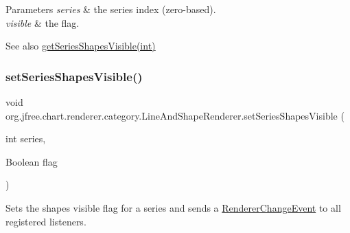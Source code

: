 \begin{DoxyParams}{Parameters}
{\em series} & the series index (zero-\/based). \\
\hline
{\em visible} & the flag.\\
\hline
\end{DoxyParams}
\begin{DoxySeeAlso}{See also}
\mbox{\hyperlink{classorg_1_1jfree_1_1chart_1_1renderer_1_1category_1_1_line_and_shape_renderer_af607c5d82294d4f53fb28935994c715d}{get\+Series\+Shapes\+Visible(int)}} 
\end{DoxySeeAlso}
\mbox{\label{classorg_1_1jfree_1_1chart_1_1renderer_1_1category_1_1_line_and_shape_renderer_a77e7ca8fcc0d5662e3430a7ea6232afb}} 
\subsubsection{\texorpdfstring{set\+Series\+Shapes\+Visible()}{setSeriesShapesVisible()}\hspace{0.1cm}{\footnotesize\ttfamily [2/2]}}
{\footnotesize\ttfamily void org.\+jfree.\+chart.\+renderer.\+category.\+Line\+And\+Shape\+Renderer.\+set\+Series\+Shapes\+Visible (\begin{DoxyParamCaption}\item[{int}]{series,  }\item[{Boolean}]{flag }\end{DoxyParamCaption})}

Sets the \textquotesingle{}shapes visible\textquotesingle{} flag for a series and sends a \mbox{\hyperlink{}{Renderer\+Change\+Event}} to all registered listeners.


